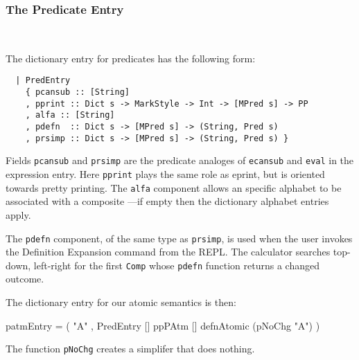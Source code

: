 \subsubsection{The Predicate Entry}~

The dictionary entry for predicates has the following form:
\begin{verbatim}
  | PredEntry
    { pcansub :: [String]
    , pprint :: Dict s -> MarkStyle -> Int -> [MPred s] -> PP
    , alfa :: [String]
    , pdefn  :: Dict s -> [MPred s] -> (String, Pred s)
    , prsimp :: Dict s -> [MPred s] -> (String, Pred s) }
\end{verbatim}
Fields \texttt{pcansub} and \texttt{prsimp} are the predicate analoges
of \texttt{ecansub} and \texttt{eval} in the expression entry.
Here \texttt{pprint} plays the same role as eprint,
but is oriented towards pretty printing.
The \texttt{alfa} component allows an specific alphabet to
be associated with a composite
---if empty then the dictionary alphabet entries apply.

The \texttt{pdefn} component, of the same type as \texttt{prsimp},
is used when the user invokes the Definition Expansion
command from the REPL.
The calculator searches top-down, left-right
    for the first \texttt{Comp} whose \texttt{pdefn} function
    returns a changed outcome.


The dictionary entry for our atomic semantics is then:
\begin{code}
patmEntry
 = ( "A"
   , PredEntry [] ppPAtm [] defnAtomic (pNoChg "A") )
\end{code}
The function \texttt{pNoChg} creates a simplifer that does nothing.
